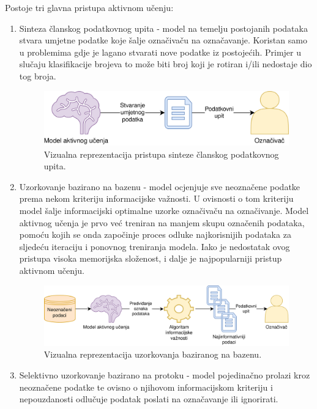 \documentclass[times, utf8, zavrsni, numeric]{fer}
\begin{document}
Postoje tri glavna pristupa aktivnom učenju:
\begin{enumerate}
    \item Sinteza članskog podatkovnog upita - model na temelju postojanih podataka stvara umjetne podatke koje šalje označivaču na označavanje. Koristan samo u problemima gdje je lagano stvarati nove podatke iz postojećih. Primjer u slučaju klasifikacije brojeva to može biti broj koji je rotiran i/ili nedostaje dio tog broja.
    \begin{figure}[H]
    \centering
    \includegraphics[width=\textwidth]{pictures/sinteza.png}
    \caption{Vizualna reprezentacija pristupa sinteze članskog podatkovnog upita. \citep{al_pictures}}
    \label{al_membership}
    \end{figure}
    \item Uzorkovanje bazirano na bazenu - model ocjenjuje sve neoznačene podatke prema nekom kriteriju informacijske važnosti. U ovisnosti o tom kriteriju model šalje informacijski optimalne uzorke označivaču na označivanje. Model aktivnog učenja je prvo već treniran na manjem skupu označenih podataka, pomoću kojih se onda započinje proces odluke najkorisnijih podataka za sljedeću iteraciju i ponovnog treniranja modela. Iako je nedostatak ovog pristupa visoka memorijska složenost, i dalje je najpopularniji pristup aktivnom učenju.
    \begin{figure}[H]
    \centering
    \includegraphics[width=\textwidth]{pictures/bazen.png}
    \caption{Vizualna reprezentacija uzorkovanja baziranog na bazenu. \citep{al_pictures}}
    \label{al_pool}
    \end{figure}
    \item Selektivno uzorkovanje bazirano na protoku - model pojedinačno prolazi kroz neoznačene podatke te ovisno o njihovom informacijskom kriteriju i nepouzdanosti odlučuje podatak poslati na označavanje ili ignorirati.

\end{enumerate}
\end{document}
